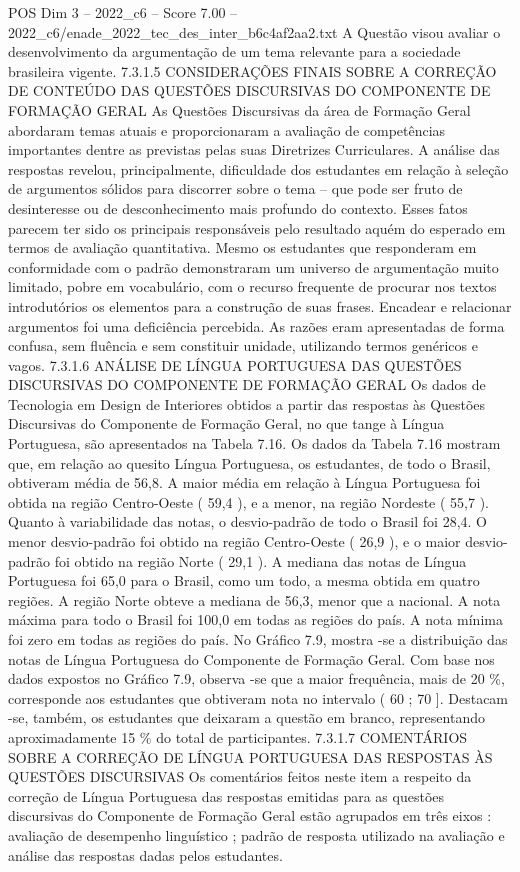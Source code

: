 \begin{textsample}{POS Dim 3 – 2022\_c6 – Score 7.00 – 2022\_c6/enade\_2022\_tec\_des\_inter\_b6c4af2aa2.txt}
A Questão visou avaliar o desenvolvimento da argumentação de um tema relevante para a sociedade brasileira vigente. 7.3.1.5 CONSIDERAÇÕES FINAIS SOBRE A CORREÇÃO DE CONTEÚDO DAS QUESTÕES DISCURSIVAS DO COMPONENTE DE FORMAÇÃO GERAL As Questões Discursivas da área de Formação Geral abordaram temas atuais e proporcionaram a avaliação de competências importantes dentre as previstas pelas suas Diretrizes Curriculares.
A análise das respostas revelou, principalmente, dificuldade dos estudantes em relação à seleção de argumentos sólidos para discorrer sobre o tema – que pode ser fruto de desinteresse ou de desconhecimento mais profundo do contexto.
Esses fatos parecem ter sido os principais responsáveis pelo resultado aquém do esperado em termos de avaliação quantitativa.
Mesmo os estudantes que responderam em conformidade com o padrão demonstraram um universo de argumentação muito limitado, pobre em vocabulário, com o recurso frequente de procurar nos textos introdutórios os elementos para a construção de suas frases.
Encadear e relacionar argumentos foi uma deficiência percebida.
As razões eram apresentadas de forma confusa, sem fluência e sem constituir unidade, utilizando termos genéricos e vagos. 7.3.1.6 ANÁLISE DE LÍNGUA PORTUGUESA DAS QUESTÕES DISCURSIVAS DO COMPONENTE DE FORMAÇÃO GERAL Os dados de Tecnologia em Design de Interiores obtidos a partir das respostas às Questões Discursivas do Componente de Formação Geral, no que tange à Língua Portuguesa, são apresentados na Tabela 7.16.
Os dados da Tabela 7.16 mostram que, em relação ao quesito Língua Portuguesa, os estudantes, de todo o Brasil, obtiveram média de 56,8.
A maior média em relação à Língua Portuguesa foi obtida na região Centro-Oeste ( 59,4 ), e a menor, na região Nordeste ( 55,7 ).
Quanto à variabilidade das notas, o desvio-padrão de todo o Brasil foi 28,4.
O menor desvio-padrão foi obtido na região Centro-Oeste ( 26,9 ), e o maior desvio-padrão foi obtido na região Norte ( 29,1 ).
A mediana das notas de Língua Portuguesa foi 65,0 para o Brasil, como um todo, a mesma obtida em quatro regiões.
A região Norte obteve a mediana de 56,3, menor que a nacional.
A nota máxima para todo o Brasil foi 100,0 em todas as regiões do país.
A nota mínima foi zero em todas as regiões do país.
No Gráfico 7.9, mostra -se a distribuição das notas de Língua Portuguesa do Componente de Formação Geral.
Com base nos dados expostos no Gráfico 7.9, observa -se que a maior frequência, mais de 20 \%, corresponde aos estudantes que obtiveram nota no intervalo ( 60 ; 70 ].
Destacam -se, também, os estudantes que deixaram a questão em branco, representando aproximadamente 15 \% do total de participantes. 7.3.1.7 COMENTÁRIOS SOBRE A CORREÇÃO DE LÍNGUA PORTUGUESA DAS RESPOSTAS ÀS QUESTÕES DISCURSIVAS Os comentários feitos neste item a respeito da correção de Língua Portuguesa das respostas emitidas para as questões discursivas do Componente de Formação Geral estão agrupados em três eixos : avaliação de desempenho linguístico ; padrão de resposta utilizado na avaliação e análise das respostas dadas pelos estudantes.

\end{textsample}
